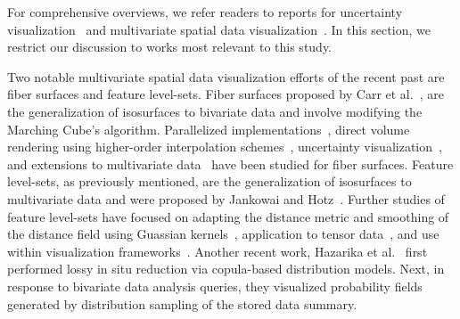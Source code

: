 %
For comprehensive overviews, we refer readers to reports for uncertainty visualization~\cite{Bonneau2014,johnson2003next,potter2011quantification} and multivariate spatial data visualization~\cite{he2019multivariate}.
%
In this section, we restrict our discussion to works most relevant to this study.

Two notable multivariate spatial data visualization efforts of the recent past are fiber surfaces and feature level-sets.
%
Fiber surfaces proposed by Carr et al.~\cite{carr2015fiber}, are the generalization of isosurfaces to bivariate data and involve modifying the Marching Cube's algorithm.
%
Parallelized implementations~\cite{klacansky2016fast}, direct volume rendering using higher-order interpolation schemes~\cite{wu2016direct}, uncertainty visualization~\cite{zheng2021uncertainty}, and extensions to multivariate data~\cite{blecha2020fiber} have been studied for fiber surfaces.  
%
Feature level-sets, as previously mentioned, are the generalization of isosurfaces to multivariate data and were proposed by Jankowai and Hotz~\cite{jankowai2020feature}.
%
Further studies of feature level-sets have focused on adapting the distance metric and smoothing of the distance field using Guassian kernels~\cite{nguyen2020visualization}, application to tensor data~\cite{jankowai2020tensor}, and use within visualization frameworks~\cite{jonsson2020inviwo}.
%
%
Another recent work, Hazarika et al.~\cite{hazarika2018codda} first performed lossy in situ reduction via copula-based distribution models. 
%
Next, in response to bivariate data analysis queries, they visualized probability fields generated by distribution sampling of the stored data summary. 
%

%


